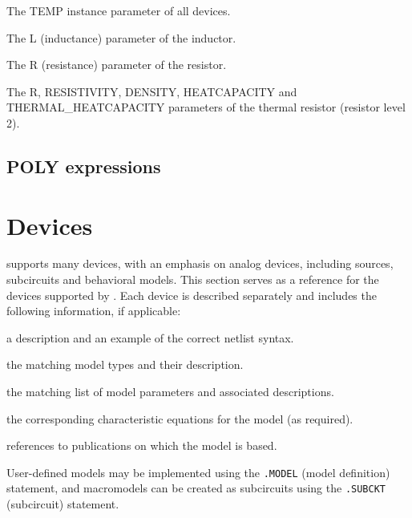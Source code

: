 \begin{XyceItemize}
\item The \textrm{TEMP} instance parameter of all devices.
\item The \textrm{L} (inductance) parameter of the inductor.
\item The \textrm{R} (resistance) parameter of the resistor.
\item The \textrm{R}, \textrm{RESISTIVITY}, \textrm{DENSITY}, \textrm{HEATCAPACITY} and \textrm{THERMAL\_HEATCAPACITY} parameters of the thermal resistor (resistor level 2).
\end{XyceItemize}

\subsection{POLY expressions}
\label{PspicePoly}




\newpage
\section{Devices}
\label{Analog_Devices}

\Xyce{} supports many devices, with an emphasis on analog devices, including
sources, subcircuits and behavioral models.  This section serves as a reference
for the devices supported by \Xyce{}.  Each device is described separately and
includes the following information, if applicable:
\begin{XyceItemize}
\item a description and an example of the correct netlist syntax.
\item the matching model types and their description.
\item the matching list of model parameters and associated descriptions.
\item the corresponding
 characteristic equations for the model (as required).
\item references to publications on which the model is based.
\end{XyceItemize}
User-defined models may be implemented using the  \texttt{.MODEL} (model definition)
statement, and macromodels can be created as subcircuits using the
 \texttt{.SUBCKT}
(subcircuit) statement.

